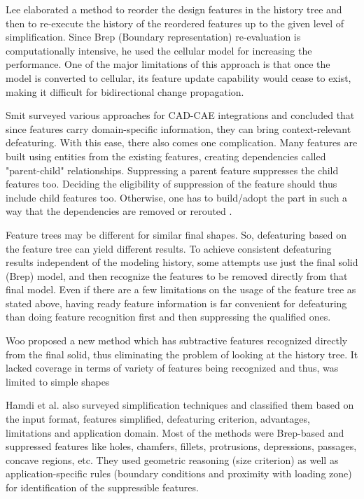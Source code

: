 Lee \cite{Lee2005, SangHunLee2005, Lee2009} elaborated a method to reorder the design features in the history tree and then to re-execute the history of the reordered features up to the given level of simplification. Since Brep (Boundary representation) re-evaluation is computationally intensive, he used the cellular model for increasing the performance. One of the major limitations of this approach is that once the model is converted to cellular, its feature update capability would cease to exist, making it difficult for bidirectional change propagation.
	 
 Smit \cite{Smit2009} surveyed various approaches for CAD-CAE integrations and concluded that since features carry domain-specific information, they can bring context-relevant defeaturing. With this ease, there also comes one complication. Many features are built using entities from the existing features, creating dependencies called "parent-child" relationships. Suppressing a parent feature suppresses the child features too. Deciding the eligibility of suppression of the feature should thus include child features too. Otherwise, one has to build/adopt the part in such a way that the dependencies are removed or rerouted \cite{AmesRiveraWebbHensinger1997}.

Feature trees may be different for similar final shapes. So, defeaturing based on the feature tree can yield different results. To achieve consistent defeaturing results independent of the modeling history, some attempts use just the final solid (Brep) model, and then recognize the features \cite{Woo2009} to be removed directly from that final model. Even if there are a few limitations on the usage of the feature tree as stated above, having ready feature information is far convenient for defeaturing than doing feature recognition first and then suppressing the qualified ones. 

Woo \cite{Woo2009} proposed a new method which has subtractive features recognized directly from the final solid, thus eliminating the problem of looking at the history tree. It lacked coverage in terms of variety of features being recognized and thus, was limited to simple shapes

	Hamdi et al. \cite{Hamdi2012a} also surveyed simplification techniques and classified them based on the input format, features simplified, defeaturing criterion, advantages, limitations and application domain. Most of the methods were Brep-based and suppressed features like holes, chamfers, fillets, protrusions, depressions, passages, concave regions, etc. They used geometric reasoning (size criterion) as well as application-specific rules (boundary conditions and proximity with loading zone) for identification of the suppressible features.  
	

